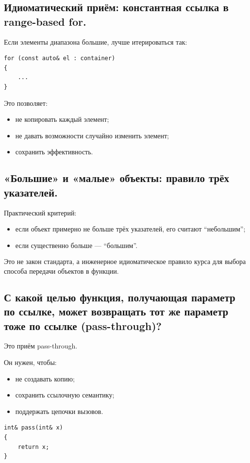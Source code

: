 \subsection{Идиоматический приём: константная ссылка в range-based for.}

Если элементы диапазона большие, лучше итерироваться так:
\begin{verbatim}
for (const auto& el : container)
{
    ...
}
\end{verbatim}

Это позволяет:
\begin{itemize}
    \item не копировать каждый элемент;
    \item не давать возможности случайно изменить элемент;
    \item сохранить эффективность.
\end{itemize}


\subsection{«Большие» и «малые» объекты: правило трёх указателей.}

Практический критерий:
\begin{itemize}
    \item если объект примерно не больше трёх указателей, его считают ``небольшим'';
    \item если существенно больше --- ``большим''.
\end{itemize}

Это не закон стандарта, а инженерное идиоматическое правило курса для выбора способа передачи объектов в функции.


\subsection{С какой целью функция, получающая параметр по ссылке, может возвращать тот же параметр тоже по ссылке (pass-through)?}

Это приём pass-through.

Он нужен, чтобы:
\begin{itemize}
    \item не создавать копию;
    \item сохранить ссылочную семантику;
    \item поддержать цепочки вызовов.
\end{itemize}

\begin{example}
\begin{verbatim}
int& pass(int& x)
{
    return x;
}
\end{verbatim}
\end{example}



